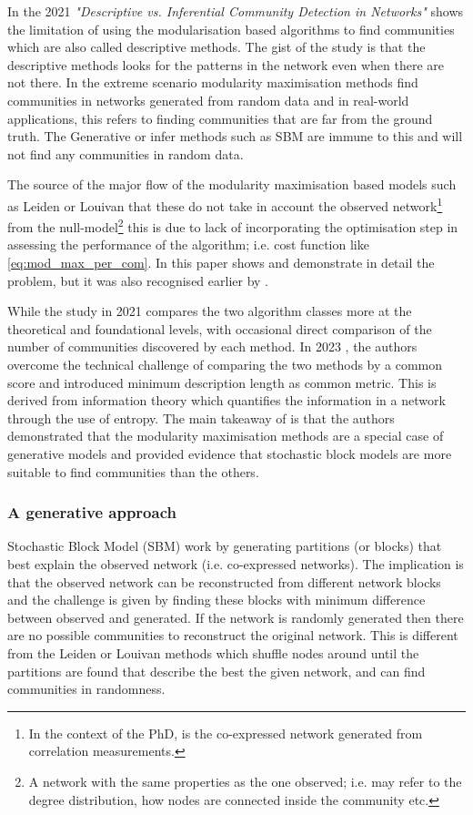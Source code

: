 In the 2021 \textit{"Descriptive vs. Inferential Community Detection in Networks"} \citet{Peixoto2021-jx} shows the limitation of using the modularisation based algorithms to find communities which are also called descriptive methods. The gist of the study is that the descriptive methods looks for the patterns in the network even when there are not there. In the extreme scenario modularity maximisation methods find communities in networks generated from random data and in real-world applications, this refers to finding communities that are far from the ground truth. The  Generative or infer methods such as SBM are immune to this and will not find any communities in random data.

The source of the major flow of the modularity maximisation based models such as Leiden or Louivan that these do not take in account the observed network\footnote{In the context of the PhD, is the co-expressed network generated from correlation measurements.} from the null-model\footnote{A network with the same properties as the one observed; i.e. may refer to the degree distribution, how nodes are connected inside the community etc.} this is due to lack of incorporating the optimisation step in assessing the performance of the algorithm; i.e. cost function like \cref{eq:mod_max_per_com}. In this paper \citet{Peixoto2021-jx} shows and demonstrate in detail the problem, but it was also recognised earlier by \citet{Guimera2004-gv}.

While the study in 2021 \citet{Peixoto2021-jx} compares the two algorithm classes more at the theoretical and foundational levels, with occasional direct comparison of the number of communities discovered by each method. In 2023 \citet{Peixoto2023-rt}, the authors overcome the technical challenge of comparing the two methods by a common score and introduced minimum description length as common metric. This is derived from information theory which quantifies the information in a network through the use of entropy. The main takeaway of \citet{Peixoto2023-rt} is that the authors demonstrated that the modularity maximisation methods are a special case of generative models and provided evidence that stochastic block models are more suitable to find communities than the others.

\subsubsection{A generative approach} \label{s:lit:sbm}


Stochastic Block Model (SBM) work by generating partitions (or blocks) that best explain the observed network (i.e. co-expressed networks). The implication is that the observed network can be reconstructed from different network blocks and the challenge is given by finding these blocks with minimum difference between observed and generated. If the network is randomly generated then there are no possible communities to reconstruct the original network. This is  different from the Leiden or Louivan methods which shuffle nodes around until the partitions are found that describe the best the given network, and can find communities in randomness. 

